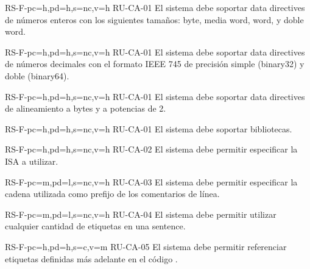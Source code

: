 
\begin{softwareReq}{RS-F-}{pc=h,pd=h,s=nc,v=h}
    {RU-CA-01}
    El sistema debe soportar \glspl{data directive} de números enteros con los
    siguientes tamaños: byte, media \gls{word}, \gls{word}, y doble \gls{word}.
\end{softwareReq}

\begin{softwareReq}{RS-F-}{pc=h,pd=h,s=nc,v=h}
    {RU-CA-01}
    El sistema debe soportar \glspl{data directive} de números decimales con el
    formato IEEE 745 de precisión simple (binary32) y doble (binary64).
\end{softwareReq}

\begin{softwareReq}{RS-F-}{pc=h,pd=h,s=nc,v=h}
    {RU-CA-01}
    El sistema debe soportar \glspl{data directive} de alineamiento a bytes y a
    potencias de 2.
\end{softwareReq}

\begin{softwareReq}{RS-F-}{pc=h,pd=h,s=nc,v=h}
    {RU-CA-01}
    El sistema debe soportar bibliotecas. %
\end{softwareReq}

\begin{softwareReq}{RS-F-}{pc=h,pd=h,s=nc,v=h}
    {RU-CA-02}
    El sistema debe permitir especificar la \gls{ISA} a utilizar.
\end{softwareReq}

\begin{softwareReq}{RS-F-}{pc=m,pd=l,s=nc,v=h}
    {RU-CA-03}
    El sistema debe permitir especificar la cadena utilizada como prefijo de los
    comentarios de línea.
\end{softwareReq}

\begin{softwareReq}{RS-F-}{pc=m,pd=l,s=nc,v=h}
    {RU-CA-04}
    El sistema debe permitir utilizar cualquier cantidad de etiquetas en una
    \gls{sentence}.
\end{softwareReq}

\begin{softwareReq}{RS-F-}{pc=h,pd=h,s=c,v=m}
    {RU-CA-05}
    El sistema debe permitir referenciar etiquetas definidas más adelante en el
    código .
\end{softwareReq}

